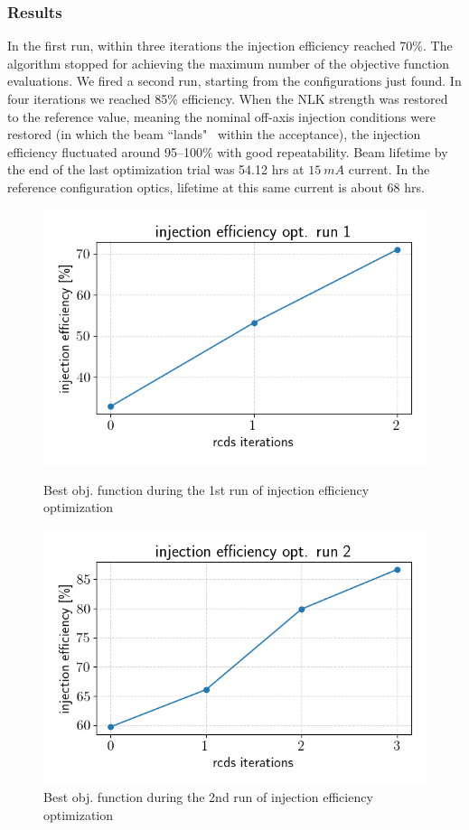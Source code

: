 \documentclass[a4paper,11pt]{article}
\begin{document}
\subsubsection{Results}
In the first run, within three iterations the injection efficiency reached 70\%. The algorithm stopped for achieving the maximum number of the objective function evaluations. We fired a second run, starting from the configurations just found. In four iterations we reached 85\% efficiency. When the NLK strength was restored to the reference value, meaning the nominal off-axis injection conditions were restored (in which the beam ``lands"~ within the acceptance), the injection efficiency fluctuated around 95--100\% with good repeatability. Beam lifetime by the end of the last optimization trial was 54.12 hrs at $15~\unit{mA}$ current. In the reference configuration optics, lifetime at this same current is about 68 hrs.
\begin{figure}[]
    \centering
    \begin{minipage}{0.48\textwidth}
        \includegraphics[width=\columnwidth]{injeff_hist_run1.png}
        \caption{Best obj. function during the 1st run of injection efficiency optimization}
        \label{injeff_hist1}  
    \end{minipage}%
    \hfill
    \begin{minipage}{0.48\textwidth}
        \includegraphics[width=\columnwidth]{injeff_hist_run2.png}
        \caption{Best obj. function during the 2nd run of injection efficiency optimization}
        \label{injeff_hist2}
    \end{minipage}
\end{figure}
\end{document}
